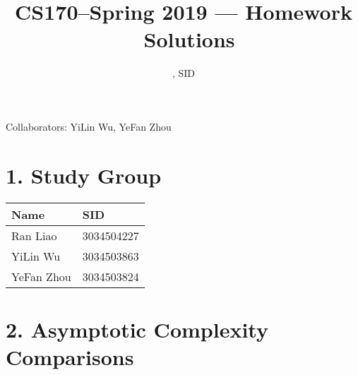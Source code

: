 \documentclass[11pt]{article}
\title{CS170--Spring 2019 --- Homework \Homework\ Solutions}
\author{\Name, SID \SID}
\date{}
\begin{document}
\maketitle
Collaborators: YiLin Wu, YeFan Zhou

\section*{1. Study Group}
\begin{tabular}{ll}
    Name        &   SID         \\\hline
    Ran Liao    &   3034504227  \\  
    YiLin Wu    &   3034503863  \\
    YeFan Zhou  &   3034503824 
\end{tabular}

\newpage
\section*{2. Asymptotic Complexity Comparisons}
\end{document}
